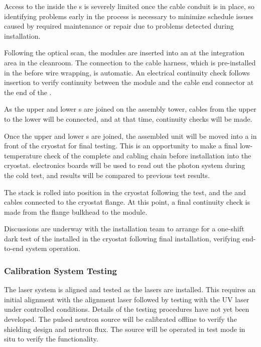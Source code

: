 Access to the  inside the s is severely limited once the  cable conduit is in place, so identifying problems early in the process is necessary to minimize schedule issues caused by required  maintenance or repair due to problems detected during installation.

Following the optical scan, the  modules are inserted into an   at the  integration area in the cleanroom. The connection to the cable harness, which is pre-installed in the  before wire wrapping, is automatic. An electrical continuity check follows insertion to verify  continuity between the  module and the  cable end connector at the end of the .

As the upper and lower s are joined on the assembly tower,  cables from the upper to the lower  will be connected, and at that time, continuity checks will be made.

Once the upper and lower s are joined, the assembled unit will be moved into a \coldbox in front of the cryostat for final testing.  This is an opportunity to make a final low-temperature check of the complete   and cabling chain before installation into the cryostat.    electronics boards will be used to read out the photon system during the cold test, and results will be compared to previous  test results.

The  stack is rolled into position in the cryostat following the \coldbox test, and the  and  cables connected to the cryostat flange.  At this point, a final continuity check is made from the flange bulkhead to the  module.

Discussions are underway with the installation team to arrange for a one-shift dark test of the installed  in the cryostat following final installation, verifying end-to-end system operation.

\subsubsection{Calibration System Testing}
The laser system is aligned and tested as the lasers are installed. This requires an initial alignment with the alignment laser followed by testing with the UV laser under controlled conditions. Details of the testing procedures have not yet been developed. The pulsed neutron source will be calibrated offline to verify the shielding design and neutron flux.  The source will be operated in test mode in situ to verify the functionality. 


